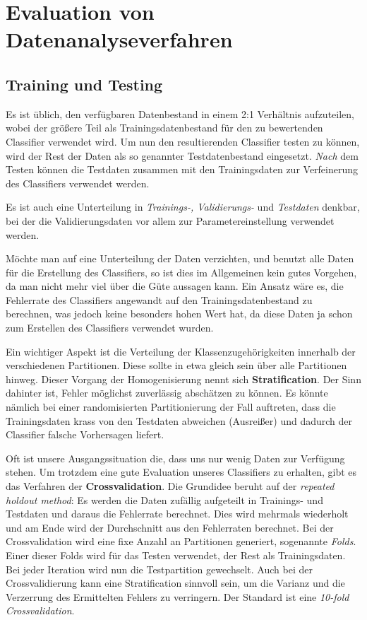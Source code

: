 \section{Evaluation von Datenanalyseverfahren}

\subsection{Training und Testing}
Es ist üblich, den verfügbaren Datenbestand in einem 2:1 Verhältnis aufzuteilen,
wobei der größere Teil als Trainingsdatenbestand für den zu bewertenden Classifier
verwendet wird. Um nun den resultierenden Classifier testen zu können, wird der
Rest der Daten als so genannter Testdatenbestand eingesetzt.
\textit{Nach} dem Testen können die Testdaten zusammen mit den Trainingsdaten zur 
Verfeinerung des Classifiers verwendet werden.

Es ist auch eine Unterteilung in \textit{Trainings-, Validierungs-} und 
\textit{Testdaten} denkbar, bei der die Validierungsdaten vor allem zur Parametereinstellung
verwendet werden. 

Möchte man auf eine Unterteilung der Daten verzichten, und benutzt alle Daten für
die Erstellung des Classifiers, so ist dies im Allgemeinen kein gutes Vorgehen,
da man nicht mehr viel über die Güte aussagen kann. Ein Ansatz wäre es, die
Fehlerrate des Classifiers angewandt auf den Trainingsdatenbestand zu berechnen,
was jedoch keine besonders hohen Wert hat, da diese Daten ja schon zum Erstellen des
Classifiers verwendet wurden.

Ein wichtiger Aspekt ist die Verteilung der Klassenzugehörigkeiten innerhalb der
verschiedenen Partitionen. Diese sollte in etwa gleich sein über alle Partitionen
hinweg. Dieser Vorgang der Homogenisierung nennt sich \textbf{Stratification}.
Der Sinn dahinter ist, Fehler möglichst zuverlässig abschätzen zu können. 
Es könnte nämlich bei einer randomisierten Partitionierung der Fall 
auftreten, dass die Trainingsdaten krass von den Testdaten abweichen (Ausreißer) 
und dadurch der Classifier falsche Vorhersagen liefert.

Oft ist unsere Ausgangssituation die, dass uns nur wenig Daten zur Verfügung
stehen. Um trotzdem eine gute Evaluation unseres Classifiers zu erhalten, gibt es
das Verfahren der \textbf{Crossvalidation}. Die Grundidee beruht auf der 
\textit{repeated holdout method}: Es werden die Daten zufällig aufgeteilt in
Trainings- und Testdaten und daraus die Fehlerrate berechnet. Dies wird mehrmals
wiederholt und am Ende wird der Durchschnitt aus den Fehlerraten berechnet.
Bei der Crossvalidation wird eine fixe Anzahl an Partitionen generiert, sogenannte
\textit{Folds}. Einer dieser Folds wird für das Testen verwendet, der Rest als
Trainingsdaten. Bei jeder Iteration wird nun die Testpartition gewechselt.
Auch bei der Crossvalidierung kann eine Stratification sinnvoll sein, um die
Varianz und die Verzerrung des Ermittelten Fehlers zu verringern. Der Standard
ist eine \textit{10-fold Crossvalidation}.

